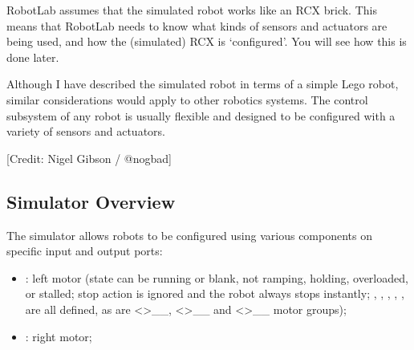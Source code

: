 \documentclass[letterpaper,10pt,english]{sphinxmanual}
\let\sphinxpxdimen\pdfpxdimen\else\newdimen\sphinxpxdimen
\begin{document}
RobotLab assumes that the simulated robot works like an RCX brick. This means that RobotLab needs to know what kinds of sensors and actuators are being used, and how the (simulated) RCX is ‘configured’. You will see how this is done later.

Although I have described the simulated robot in terms of a simple Lego robot, similar considerations would apply to other robotics systems. The control subsystem of any robot is usually flexible and designed to be configured with a variety of sensors and actuators.

\sphinxincludegraphics[width=4608\sphinxpxdimen,height=2592\sphinxpxdimen]{{nogbad_ev3}.jpg}

{[}Credit: Nigel Gibson / @nogbad{]}


\subsection{Simulator Overview}
\label{\detokenize{content/00_SOFTWARE_GUIDE/Section_00_02_ev3devsim_simulator_overview:Simulator-Overview}}
The  simulator allows robots to be configured using various components on specific input and output ports:
\begin{itemize}
\item {} 
: left motor (state can be running or blank, not ramping, holding, overloaded, or stalled; stop action is ignored and the robot always stops instantly; , , , , ,  are all defined, as are  \textless{}\textgreater{}\textasciigrave{}\_\_,
 \textless{}\textgreater{}\textasciigrave{}\_\_ and  \textless{}\textgreater{}\textasciigrave{}\_\_ motor groups);

\item {} 
: right motor;

\end{itemize}
\end{document}
